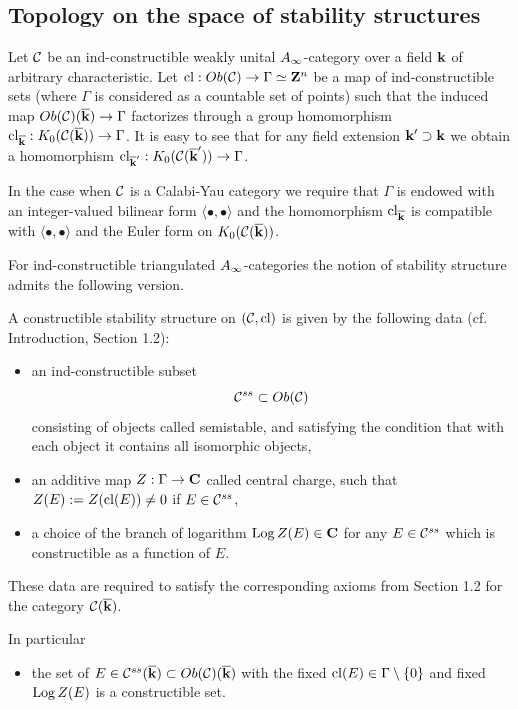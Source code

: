 \documentclass[12pt]{article}
\begin{document}
\subsection{Topology on the space of stability structures}

Let ${\mathcal C}$ be an ind-constructible weakly unital $A_{\infty}$-category over a field ${\bf k}$ of arbitrary characteristic.
Let $\operatorname{cl}: Ob({\mathcal C})\to \Gamma\simeq {\bf Z}^n$ be a map of ind-constructible sets (where $\Gamma$ is considered as a countable set of points) such that the induced map $ Ob({\mathcal C})(\overline{{\bf k}})\to \Gamma$ factorizes through a group
homomorphism $\operatorname{cl}_{\overline{{\bf k}}}: K_0({\mathcal C}(\overline{{\bf k}}))\to \Gamma$. It is easy to see that for any field extension
${\bf k}^{\prime}\supset {\bf k}$ we obtain a homomorphism $\operatorname{cl}_{\overline{{\bf k}}^{\prime}}: K_0({\mathcal C}(\overline{{\bf k}}^{\prime}))\to \Gamma$.

In the case when ${\mathcal C}$ is a Calabi-Yau category we require that $\Gamma$ is endowed with an integer-valued bilinear
form $\langle \bullet,\bullet\rangle$ and the homomorphism $\operatorname{cl}_{\overline{{\bf k}}}$ is compatible with $\langle \bullet,\bullet\rangle$ and the Euler form on $K_0({\mathcal C}(\overline{{\bf k}}))$.

For ind-constructible
triangulated $A_{\infty}$-categories the notion of stability structure admits the following version.

\begin{defn} A constructible stability structure on $({\mathcal C},\operatorname{cl})$ is given by the following data (cf. Introduction, Section 1.2):

\begin{itemize}
\item{ an ind-constructible subset 
$${\mathcal C}^{ss}\subset Ob({\mathcal C})$$  consisting of objects called semistable, and satisfying the condition that with each object it contains all isomorphic objects,}

\item{an additive map $Z:\Gamma\to {\bf C}$ called central charge, such that $Z(E):=Z(\operatorname{cl}(E))\ne 0$ if $E\in {\mathcal C}^{ss}$,}

\item{a choice of the branch of logarithm $\operatorname{Log}Z(E)\in {\bf C}$ for any $E\in {\mathcal C}^{ss}$ which is constructible as a function of $E$.}

\end{itemize}

These data are required to satisfy the corresponding axioms from Section 1.2 for the category
${\mathcal C}(\overline{{\bf k}})$.

In particular
\begin{itemize}
\item{the set of $E\in {\mathcal C}^{ss}(\overline{{\bf k}})\subset Ob({\mathcal C})(\overline{{\bf k}})$ with the fixed $\operatorname{cl}(E)\in \Gamma\setminus \{0\}$ and fixed $\operatorname{Log}Z(E)$ is a constructible set.}
\end{itemize}
\end{defn}
\end{document}
